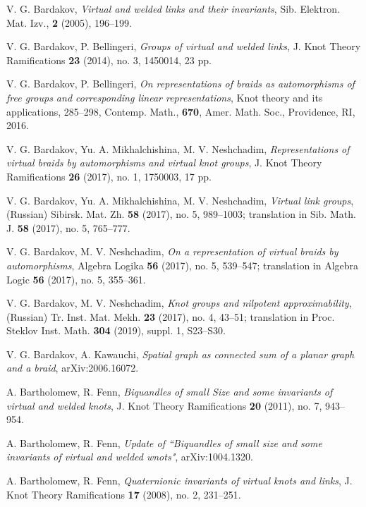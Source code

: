 \documentclass[11 pt, reqno]{amsart}
\theoremstyle{definition}
\numberwithin{equation}{subsection}
\begin{document}
\begin{thebibliography}{HD}

V. G. Bardakov, \textit{Virtual and welded links and their invariants}, Sib. Elektron. Mat. Izv., \textbf{2} (2005), 196--199.

V. G. Bardakov, P. Bellingeri, \textit{Groups of virtual and welded links}, J. Knot Theory Ramifications \textbf{23} (2014), no. 3, 1450014, 23 pp.

V. G. Bardakov, P. Bellingeri, \textit{On representations of braids as automorphisms of free groups and corresponding linear representations}, Knot theory and its applications, 285--298, Contemp. Math., \textbf{670}, Amer. Math. Soc., Providence, RI, 2016.

V. G. Bardakov, Yu. A. Mikhalchishina, M. V. Neshchadim, \textit{Representations of virtual braids by automorphisms and virtual knot groups}, J. Knot Theory Ramifications \textbf{26} (2017), no. 1, 1750003, 17 pp.

V. G. Bardakov, Yu. A. Mikhalchishina, M. V. Neshchadim, \textit{Virtual link groups}, (Russian) Sibirsk. Mat. Zh. \textbf{58} (2017), no. 5, 989--1003; translation in Sib. Math. J. \textbf{58} (2017), no. 5, 765--777.

V. G. Bardakov, M. V. Neshchadim, \textit{On a representation of virtual braids by automorphisms}, Algebra Logika \textbf{56} (2017), no. 5, 539--547; translation in Algebra Logic \textbf{56} (2017), no. 5, 355--361.

V. G. Bardakov, M. V. Neshchadim, \textit{Knot groups and nilpotent approximability}, (Russian) Tr. Inst. Mat. Mekh. \textbf{23} (2017), no. 4, 43--51; translation in Proc. Steklov Inst. Math. \textbf{304} (2019), suppl. 1, S23--S30.

V. G. Bardakov, A. Kawauchi, \textit{Spatial graph as connected sum of a planar graph and a braid}, arXiv:2006.16072.

A. Bartholomew, R. Fenn, \textit{Biquandles of small Size and some invariants of virtual and welded knots}, J. Knot Theory Ramifications \textbf{20} (2011), no. 7, 943--954.

A. Bartholomew, R. Fenn, \textit{Update of ``Biquandles of small size and some invariants of virtual and welded wnots"}, arXiv:1004.1320.

A. Bartholomew, R. Fenn, \textit{Quaternionic invariants of virtual knots and links},  J. Knot Theory Ramifications \textbf{17} (2008), no. 2, 231--251.


\end{thebibliography}
\end{document}

